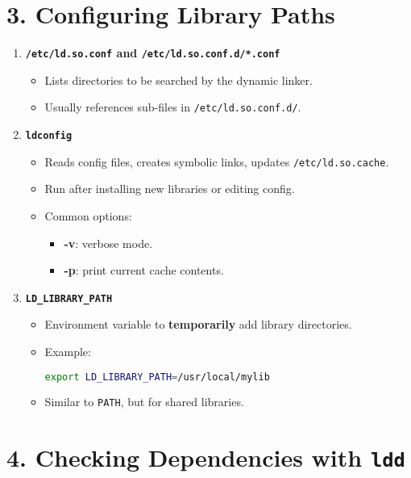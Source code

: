 \documentclass[12pt,a4paper]{report}
\begin{document}
\section*{3. Configuring Library Paths}

\begin{enumerate}
    \item \textbf{\texttt{/etc/ld.so.conf} and \texttt{/etc/ld.so.conf.d/*.conf}}
    \begin{itemize}
        \item Lists directories to be searched by the dynamic linker.
        \item Usually references sub-files in \texttt{/etc/ld.so.conf.d/}.
    \end{itemize}

    \item \textbf{\texttt{ldconfig}}
    \begin{itemize}
        \item Reads config files, creates symbolic links, updates \texttt{/etc/ld.so.cache}.
        \item Run after installing new libraries or editing config.
        \item Common options:
        \begin{itemize}
            \item \textbf{-v}: verbose mode.
            \item \textbf{-p}: print current cache contents.
        \end{itemize}
    \end{itemize}

    \item \textbf{\texttt{LD\_LIBRARY\_PATH}}
    \begin{itemize}
        \item Environment variable to \textbf{temporarily} add library directories.
        \item Example:
        \begin{lstlisting}[language=bash]
export LD_LIBRARY_PATH=/usr/local/mylib
        \end{lstlisting}
        \item Similar to \texttt{PATH}, but for shared libraries.
    \end{itemize}
\end{enumerate}

\section*{4. Checking Dependencies with \texttt{ldd}}
\end{document}
